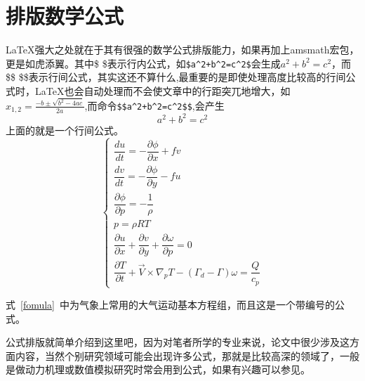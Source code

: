 \section{排版数学公式}
\LaTeX 强大之处就在于其有很强的数学公式排版能力，如果再加上amsmath宏包，更是如虎添翼。其中\$  \$表示行内公式，如\verb|$a^2+b^2=c^2$|会生成$a^2+b^2=c^2$，而\$\$  \$\$表示行间公式，其实这还不算什么,最重要的是即使处理高度比较高的行间公式时，\LaTeX 也会自动处理而不会使文章中的行距突兀地增大，如$x_{1,2}= \frac{-b\pm \sqrt{b^2-4ac}}{2a}$,而命令\verb|$$a^2+b^2=c^2$$|,会产生$$a^2+b^2=c^2$$
上面的就是一个行间公式。
\begin{equation}\label{fomula}
\begin{cases}


\dfrac{du}{dt}=-\dfrac{\partial \phi}{\partial x}+fv\\[1.5ex]
\dfrac{dv}{dt}=-\dfrac{\partial \phi}{\partial y}-fu\\[1.5ex]
\dfrac{\partial \phi}{\partial p}=-\dfrac{1}{\rho}\\[1.5ex]
p= \rho RT\\[1.5ex]

\dfrac{\partial u}{\partial x}+\dfrac{\partial v}{\partial y}+
\dfrac{\partial \omega}{\partial p}=0\\[1.5ex]
\dfrac{\partial T}{\partial t}+\overrightarrow{V}\times \nabla_pT-(\Gamma_d-\Gamma)\omega=\dfrac{Q}{c_p}
\end{cases}
\end{equation}

式~\ref{fomula}~中为气象上常用的大气运动基本方程组，而且这是一个带编号的公式。

公式排版就简单介绍到这里吧，因为对笔者所学的专业来说，论文中很少涉及这方面内容，当然个别研究领域可能会出现许多公式，那就是比较高深的领域了，一般是做动力机理或数值模拟研究时常会用到公式，如果有兴趣可以参见。
